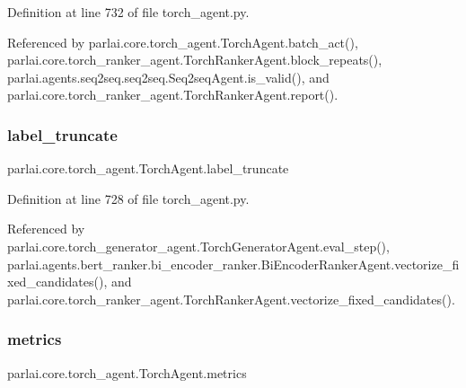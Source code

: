 Definition at line 732 of file torch\+\_\+agent.\+py.



Referenced by parlai.\+core.\+torch\+\_\+agent.\+Torch\+Agent.\+batch\+\_\+act(), parlai.\+core.\+torch\+\_\+ranker\+\_\+agent.\+Torch\+Ranker\+Agent.\+block\+\_\+repeats(), parlai.\+agents.\+seq2seq.\+seq2seq.\+Seq2seq\+Agent.\+is\+\_\+valid(), and parlai.\+core.\+torch\+\_\+ranker\+\_\+agent.\+Torch\+Ranker\+Agent.\+report().

\mbox{\label{classparlai_1_1core_1_1torch__agent_1_1TorchAgent_adbdd7cf2deb2c43d982c57852b83e685}} 
\subsubsection{\texorpdfstring{label\+\_\+truncate}{label\_truncate}}
{\footnotesize\ttfamily parlai.\+core.\+torch\+\_\+agent.\+Torch\+Agent.\+label\+\_\+truncate}



Definition at line 728 of file torch\+\_\+agent.\+py.



Referenced by parlai.\+core.\+torch\+\_\+generator\+\_\+agent.\+Torch\+Generator\+Agent.\+eval\+\_\+step(), parlai.\+agents.\+bert\+\_\+ranker.\+bi\+\_\+encoder\+\_\+ranker.\+Bi\+Encoder\+Ranker\+Agent.\+vectorize\+\_\+fixed\+\_\+candidates(), and parlai.\+core.\+torch\+\_\+ranker\+\_\+agent.\+Torch\+Ranker\+Agent.\+vectorize\+\_\+fixed\+\_\+candidates().

\mbox{\label{classparlai_1_1core_1_1torch__agent_1_1TorchAgent_a392ed66573001dfa2846d5042e8fc5a5}} 
\subsubsection{\texorpdfstring{metrics}{metrics}}
{\footnotesize\ttfamily parlai.\+core.\+torch\+\_\+agent.\+Torch\+Agent.\+metrics}



